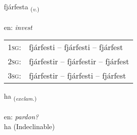 \documentclass[frontgrid, backgrid]{flacards}\usepackage[]{graphicx}\usepackage[]{color}
\begin{document}
\renewcommand{\flhead}{\vskip5pt \fboxsep=0pt {\small\bfseries\footnotesize Sagnorð | Verb}}
\renewcommand{\fcfoot}{\vskip5pt \fboxsep=0pt \hspace{2pt}{\small\bfseries\footnotesize 2K}}

\renewcommand{\blhead}{\vskip5pt {\small\bfseries\footnotesize Sagnorð | Verb }}
\renewcommand{\bcfoot}{\vskip5pt \hspace{2pt}{\small\bfseries\footnotesize 2K}}


{fjárfesta \small{\textsubscript{(\textit{v.})}} \\[1ex] %
 \\
en: \emph{invest} \\  [2ex]
\renewcommand*{\arraystretch}{0.8}
\begin{tabular}{p{1cm}l}
\textsc{1sg}: & fjárfesti -- fjárfesti -- fjárfest \\ 
\textsc{2sg}: & fjárfestir -- fjárfestir -- fjárfest \\ 
\textsc{3sg}: & fjárfestir -- fjárfesti -- fjárfest \\ 
\end{tabular}
}


\renewcommand{\flhead}{\vskip5pt \fboxsep=0pt {\small\bfseries\footnotesize Upphrópanir | Exclamation}}
\renewcommand{\fcfoot}{\vskip5pt \fboxsep=0pt \hspace{2pt}{\small\bfseries\footnotesize 2K}}

\renewcommand{\blhead}{\vskip5pt {\small\bfseries\footnotesize Upphrópanir | Exclamation }}
\renewcommand{\bcfoot}{\vskip5pt \hspace{2pt}{\small\bfseries\footnotesize 2K}}


{ha \small{\textsubscript{(\textit{exclam.})}} \\[1ex]
\textphonetic{[haː]} \\
en: \emph{pardon?} \\  [2ex]
ha (Indeclinable)}
\end{document}
